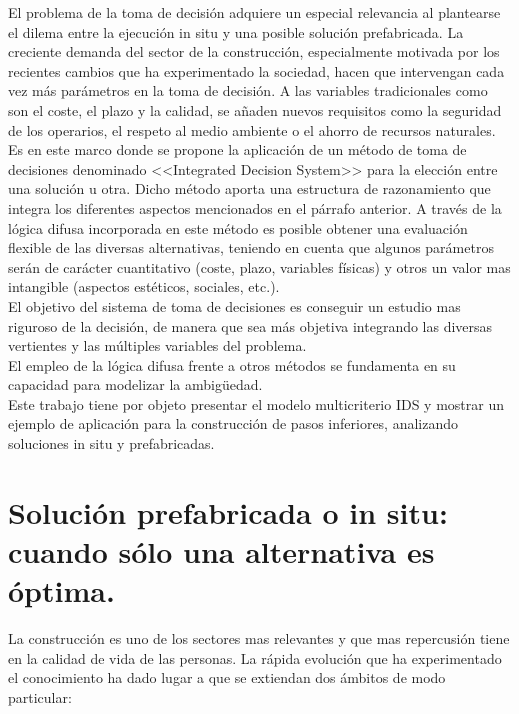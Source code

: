 \documentclass[10pt]{article}
\begin{document}
El problema de la toma de decisión adquiere un especial relevancia al plantearse el dilema entre la ejecución in situ y una posible solución prefabricada. La creciente demanda del sector de la construcción, especialmente motivada por los recientes cambios que ha experimentado la sociedad, hacen que intervengan cada vez más parámetros en la toma de decisión. A las variables tradicionales como son el coste, el plazo y la calidad, se añaden nuevos requisitos como la seguridad de los operarios, el respeto al medio ambiente o el ahorro de recursos naturales. \\

Es en este marco donde se propone la aplicación de un método de toma de decisiones denominado <<Integrated Decision System>> para la elección entre una solución u otra. Dicho método aporta una estructura de razonamiento que integra los diferentes aspectos mencionados en el párrafo anterior. A través de la lógica difusa incorporada en este método es posible obtener una evaluación flexible de las diversas alternativas, teniendo en cuenta que algunos parámetros serán de carácter cuantitativo (coste, plazo, variables físicas) y otros un valor mas intangible (aspectos estéticos, sociales, etc.).\\

El objetivo del sistema de toma de decisiones es conseguir un estudio mas riguroso de la decisión, de manera que sea más objetiva integrando las diversas vertientes y las múltiples variables del problema.\\


El empleo de la lógica difusa frente a otros métodos se fundamenta en su capacidad para modelizar la ambigüedad.\\

Este trabajo tiene por objeto presentar el modelo multicriterio IDS y mostrar un ejemplo de aplicación para la construcción de pasos inferiores, analizando soluciones in situ y prefabricadas. \\

\section{Solución prefabricada o in situ: cuando sólo una alternativa es óptima.} 

La construcción es uno de los sectores mas relevantes y que mas repercusión tiene en la calidad de vida de las personas. La rápida evolución que ha experimentado el conocimiento ha dado lugar a que se extiendan dos ámbitos de modo particular:
\end{document}
